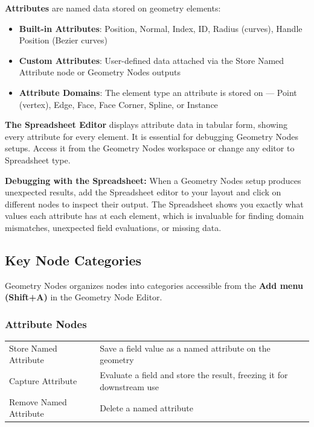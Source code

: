 \textbf{Attributes} are named data stored on geometry elements:
\begin{itemize}[leftmargin=2em]
  \item \textbf{Built-in Attributes}: Position, Normal, Index, ID, Radius (curves), Handle Position (Bezier curves)
  \item \textbf{Custom Attributes}: User-defined data attached via the Store Named Attribute node or Geometry Nodes outputs
  \item \textbf{Attribute Domains}: The element type an attribute is stored on --- Point (vertex), Edge, Face, Face Corner, Spline, or Instance
\end{itemize}

\textbf{The Spreadsheet Editor} displays attribute data in tabular form, showing every attribute for every element. It is essential for debugging Geometry Nodes setups. Access it from the Geometry Nodes workspace or change any editor to Spreadsheet type.

\begin{tipbox}
\textbf{Debugging with the Spreadsheet:} When a Geometry Nodes setup produces unexpected results, add the Spreadsheet editor to your layout and click on different nodes to inspect their output. The Spreadsheet shows you exactly what values each attribute has at each element, which is invaluable for finding domain mismatches, unexpected field evaluations, or missing data.
\end{tipbox}

\subsection{Key Node Categories}
\label{sec:gnnodes}

Geometry Nodes organizes nodes into categories accessible from the \textbf{Add menu (Shift+A)} in the Geometry Node Editor.

\subsubsection{Attribute Nodes}

\begin{center}
\begin{tabularx}{\textwidth}{L{4cm}X}
\toprule
{}
 &  \\
\midrule
Store Named Attribute & Save a field value as a named attribute on the geometry \\
Capture Attribute & Evaluate a field and store the result, freezing it for downstream use \\
Remove Named Attribute & Delete a named attribute \\
\bottomrule
\end{tabularx}
\end{center}

